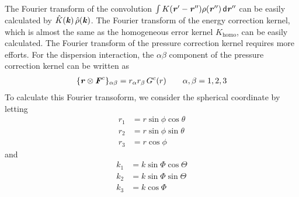 \documentclass[aps,pre,preprint,unsortedaddress]{revtex4}
\renewcommand{\v}[1]{\textbf{\textit{#1}}}
\renewcommand{\d}[1]{\textsf{#1}}
\begin{document}
The Fourier transform of the convolution $\int K(\v r' - \v r'')
\rho(\v r'')\,\d d\v r''$ can be easily calculated by $\hat K(\v
k)\,\hat \rho(\v k)$.  The Fourier transform of the energy correction
kernel, which is almost the same as the homogeneous error kernel
$K_{\textrm{homo}}$, can be easily calculated. The Fourier transform
of the pressure correction kernel requires more efforts.  For the
dispersion interaction, the $\alpha\beta$ component of the pressure
correction kernel can be written as
\begin{align}
  \{\v r\otimes\v F^c\}_{\alpha\beta} = r_\alpha r_\beta \,G^c(r) \qquad \alpha, \beta = 1, 2, 3
\end{align}
To calculate this Fourier transoform, we consider the spherical
coordinate by letting
\begin{align} \nonumber
  r_1 &= r\sin\phi\cos\theta \\\nonumber
  r_2 &= r\sin\phi\sin\theta \\\nonumber
  r_3 &= r\cos\phi
\end{align}
and 
\begin{align} \nonumber
  k_1 &= k\sin\Phi\cos\Theta \\\nonumber
  k_2 &= k\sin\Phi\sin\Theta \\\nonumber
  k_3 &= k\cos\Phi
\end{align}
\end{document}
